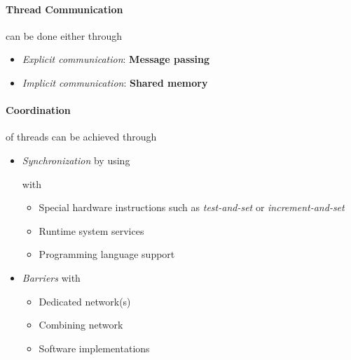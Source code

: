 \paragraph{Thread Communication} can be done either through
\begin{itemize}
	\item \emph{Explicit communication}: {\bf Message passing}

	\item \emph{Implicit communication}: {\bf Shared memory}
\end{itemize}


\paragraph{Coordination} of threads can be achieved through
\begin{itemize}
	\item \emph{Synchronization} by using
		with
		\begin{itemize}
			\item Special hardware instructions such as \emph{test-and-set} or \emph{increment-and-set}
			\item Runtime system services
			\item Programming language support
		\end{itemize}

	\item \emph{Barriers} with
		\begin{itemize}
			\item Dedicated network(s)
			\item Combining network
			\item Software implementations
		\end{itemize}
\end{itemize}
